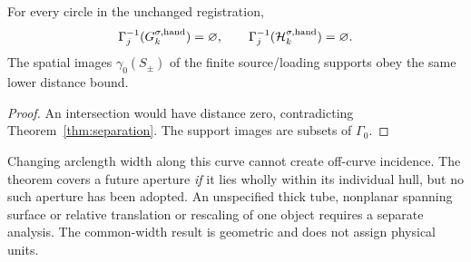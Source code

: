 \begin{corollary}\label{cor:empty}
For every circle in the unchanged registration,
\begin{equation}\label{eq:empty}
 \Gamma_j^{-1}(G_k^{\sigma,\mathrm{hand}})=\varnothing,
 \qquad \Gamma_j^{-1}(\mathcal H_k^{\sigma,\mathrm{hand}})=\varnothing.
\end{equation}
The spatial images $\gamma_0(S_\pm)$ of the finite source/loading supports obey the same lower distance bound.
\end{corollary}
\begin{proof}
An intersection would have distance zero, contradicting Theorem~\ref{thm:separation}. The support images are subsets of $\Gamma_0$.
\end{proof}

Changing arclength width along this curve cannot create off-curve incidence. The theorem covers a future aperture \emph{if} it lies wholly within its individual hull, but no such aperture has been adopted. An unspecified thick tube, nonplanar spanning surface or relative translation or rescaling of one object requires a separate analysis. The common-width result is geometric and does not assign physical units.
